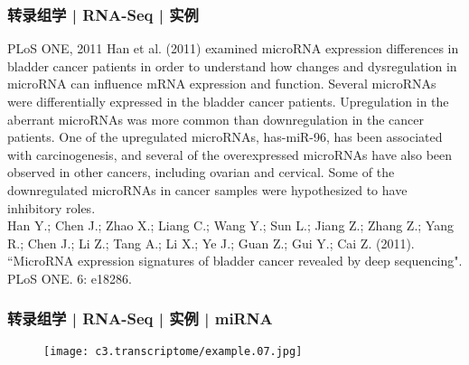 \begin{frame}
  \frametitle{转录组学 | RNA-Seq | 实例}
  \begin{block}{PLoS ONE, 2011}
  Han et al. (2011) examined microRNA expression differences in bladder cancer patients in order to understand how changes and dysregulation in microRNA can influence mRNA expression and function. Several microRNAs were differentially expressed in the bladder cancer patients. Upregulation in the aberrant microRNAs was more common than downregulation in the cancer patients. One of the upregulated microRNAs, has-miR-96, has been associated with carcinogenesis, and several of the overexpressed microRNAs have also been observed in other cancers, including ovarian and cervical. Some of the downregulated microRNAs in cancer samples were hypothesized to have inhibitory roles.\\
  \vspace{0.5em}
Han Y.; Chen J.; Zhao X.; Liang C.; Wang Y.; Sun L.; Jiang Z.; Zhang Z.; Yang R.; Chen J.; Li Z.; Tang A.; Li X.; Ye J.; Guan Z.; Gui Y.; Cai Z. (2011). ``MicroRNA expression signatures of bladder cancer revealed by deep sequencing". PLoS ONE. 6: e18286. 
  \end{block}
\end{frame}

\begin{frame}
  \frametitle{转录组学 | RNA-Seq | 实例 | miRNA}
  \begin{figure}
    \centering
    \texttt{[image: c3.transcriptome/example.07.jpg]}
  \end{figure}
\end{frame}
